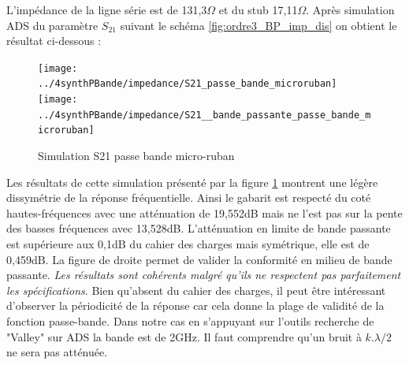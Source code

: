 \documentclass[french]{article}
\begin{document}
L'impédance de la ligne série est de 131,3$\Omega$ et du stub 17,11$\Omega$. Après simulation ADS du paramètre $S_{21}$ suivant le schéma \ref{fig:ordre3_BP_imp_dis} on obtient le résultat ci-dessous :
\begin{figure}[H]
	\centering
	\texttt{[image: ../4synthPBande/impedance/S21\_passe\_bande\_microruban]}
	\texttt{[image: ../4synthPBande/impedance/S21\_\_bande\_passante\_passe\_bande\_microruban]}
	\caption{Simulation S21 passe bande micro-ruban}
	\label{fig:ads_S21_BP_microruban}
\end{figure}
Les résultats de cette simulation présenté par la figure \ref{fig:ads_S21_BP_microruban} montrent une légère dissymétrie de la réponse fréquentielle. Ainsi le gabarit est respecté du coté hautes-fréquences avec une atténuation de 19,552dB mais ne l'est pas sur la pente des basses fréquences avec 13,528dB. L'atténuation en limite de bande passante est supérieure aux 0,1dB du cahier des charges mais symétrique, elle est de 0,459dB. La figure de droite permet de valider la conformité en milieu de bande passante. \emph{Les résultats sont cohérents malgré qu'ils ne respectent pas parfaitement les spécifications}. Bien qu'absent du cahier des charges, il peut être intéressant d'observer la périodicité de la réponse car cela donne la plage de validité de la fonction passe-bande. Dans notre cas en s'appuyant sur l'outils recherche de "Valley" sur ADS la bande est de 2GHz. Il faut comprendre qu'un bruit à $k.\lambda /2$ ne sera pas atténuée.
\end{document}
